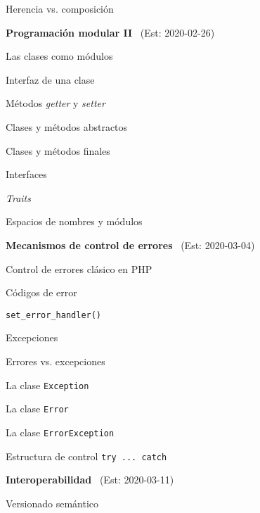 \begin{longenum}
\begin{longenum}
        \item Herencia vs. composición
    \end{longenum}
    \item \textbf{Programación modular II} \ (Est: 2020-02-26)
    \begin{longenum}
        \item Las clases como módulos
        \begin{longenum}
            \item Interfaz de una clase
            \item Métodos \textit{getter} y \textit{setter}
        \end{longenum}
        \item Clases y métodos abstractos
        \item Clases y métodos finales
        \item Interfaces
        \item \textit{Traits}
        \item Espacios de nombres y módulos
    \end{longenum}
    \item \textbf{Mecanismos de control de errores} \ (Est: 2020-03-04)
    \begin{longenum}
        \item Control de errores clásico en PHP
        \begin{longenum}
            \item Códigos de error
            \item \texttt{set\_error\_handler()}
        \end{longenum}
        \item Excepciones
        \begin{longenum}
            \item Errores vs. excepciones
            \item La clase \texttt{Exception}
            \item La clase \texttt{Error}
            \item La clase \texttt{ErrorException}
            \item Estructura de control \texttt{try ... catch}
        \end{longenum}
    \end{longenum}
    \item \textbf{Interoperabilidad} \ (Est: 2020-03-11)
    \begin{longenum}
        \item Versionado semántico

\end{longenum}
\end{longenum}

